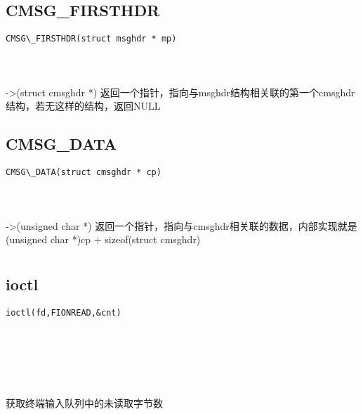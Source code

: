 \documentclass[10pt,a4paper]{article}
\begin{document}
\subsection{CMSG\_FIRSTHDR}
\begin{spacing}{2.0}
\lstset{language=C,numbers=none}
\begin{lstlisting}
CMSG\_FIRSTHDR(struct msghdr * mp)
\end{lstlisting}
{\large\color[rgb]{0.2,0.4,0.6}{mp:}}
\paragraph{ \ \ }->(struct cmsghdr *) 返回一个指针，指向与msghdr结构相关联的第一个cmsghdr结构，若无这样的结构，返回NULL
\end{spacing}

\subsection{CMSG\_DATA}
\begin{spacing}{2.0}
\lstset{language=C,numbers=none}
\begin{lstlisting}
CMSG\_DATA(struct cmsghdr * cp)
\end{lstlisting}
{\large\color[rgb]{0.2,0.4,0.6}{cp:}}
\paragraph{ \ \ }->(unsigned char *) 返回一个指针，指向与cmsghdr相关联的数据，内部实现就是(unsigned char *)cp + sizeof(struct cmsghdr)
\end{spacing}

\section{\color[rgb]{0.2,0.4,0.6}{终端设置}}
\subsection{ioctl}
\begin{spacing}{2.0}
\lstset{language=C,numbers=none}
\begin{lstlisting}
ioctl(fd,FIONREAD,&cnt)
\end{lstlisting}
{\large\color[rgb]{0.2,0.4,0.6}{fd:}} \\
{\large\color[rgb]{0.2,0.4,0.6}{FIONREAD:}} \\
{\large\color[rgb]{0.2,0.4,0.6}{\&cnt:}}
\paragraph{ \ \ }获取终端输入队列中的未读取字节数
\end{spacing}
\end{document}
